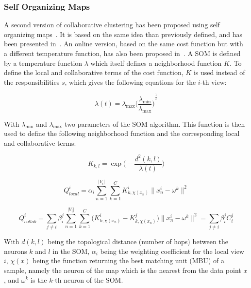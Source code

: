    \subsubsection{Self Organizing Maps}

    A second version of collaborative clustering has been proposed using self organizing maps~\cite{kohonen1998self}. It is based on the same idea than previously defined, and has been presented in~\cite{grozavu2010topological}. An online version, based on the same cost function but with a different temperature function, has also been proposed in~\cite{maurel2017incremental}. A SOM is defined by a temperature function $\lambda$ which itself defines a neighborhood function $K$. To define the local and collaborative terms of the cost function, $K$ is used instead of the responsibilities $s$, which gives the following equations for the $i$-th view:

    \begin{equation}
    \lambda(t) = \lambda_{\max}{\Big(\frac{\lambda_{\min}}{\lambda_{\max}}\Big)}^{\frac{1}{t}}
        \label{eq:som_temp}
    \end{equation}

    With $\lambda_{\min}$ and $\lambda_{\max}$ two parameters of the SOM algorithm. This function is then used to define the following neighborhood function and the corresponding local and collaborative terms:

    \begin{equation}
        K_{k,l} = \exp\Big(-\frac{d^2(k,l)}{\lambda(t)}\Big)
        \label{eq:som_neigh}
    \end{equation}

    \begin{equation}
        Q_{local}^i = \alpha_i \sum_{n=1}^{|V_i|}\sum_{k=1}^C K^i_{k,\chi(x_n)}\|x_n^i - \omega^k \|^2 
        \label{eq:som_cc_local}
    \end{equation}

    \begin{equation}
        Q_{collab}^i = \sum_{j \neq i}\beta_i^j \sum_{n=1}^{|V_i|}\sum_{k=1}^C \big(K^i_{k,\chi(x_n)} - K^j_{k,\chi(x_n)}\big)\|x_n^i - \omega^k \|^2 = \sum_{j \neq i} \beta_i^j C_i^j 
        \label{eq:som_cc_collab}
    \end{equation}

    With $d(k,l)$ being the topological distance (number of hops) between the neurons $k$ and $l$ in the SOM, $\alpha_i$ being the weighting coefficient for the local view $i$, $\chi(x)$ being the function returning the best matching unit (MBU) of a sample, namely the neuron of the map which is the nearest from the data point $x$, and $\omega^k$ is the $k$-th neuron of the SOM.\@

